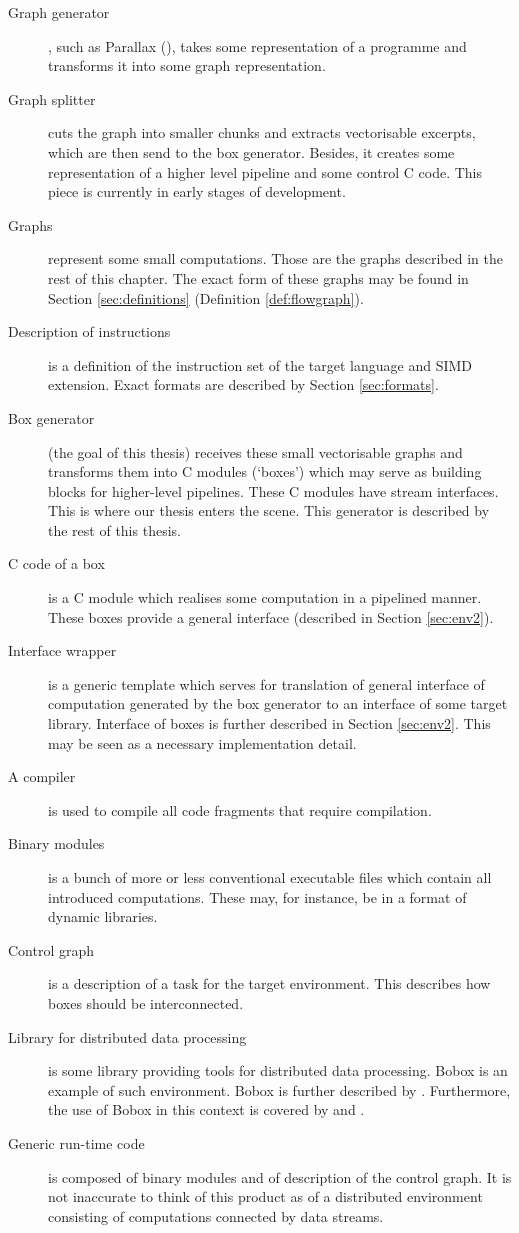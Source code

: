 \begin{description}
  \item[Graph generator], such as Parallax (\cite{pipelines}), takes some representation of a programme and transforms it into some graph representation. 
  \item[Graph splitter] cuts the graph into smaller chunks and extracts vectorisable excerpts, which are then send to the box generator. Besides, it creates some representation of a higher level pipeline and some control C code. This piece is currently in early stages of development.
  \item[Graphs] represent some small computations. Those are the graphs described in the rest of this chapter. The exact form of these graphs may be found in Section \ref{sec:definitions} (Definition \ref{def:flowgraph}).
  \item[Description of instructions] is a definition of the instruction set of the target language and SIMD extension. Exact formats are described by Section \ref{sec:formats}.
  \item[Box generator] (the goal of this thesis) receives these small vectorisable graphs and transforms them into C modules (`boxes') which may serve as building blocks for higher-level pipelines. These C modules have stream interfaces. This is where our thesis enters the scene. This generator is described by the rest of this thesis.
  \item[C code of a box] is a C module which realises some computation in a pipelined manner. These boxes provide a general interface (described in Section \ref{sec:env2}).
  \item[Interface wrapper] is a generic template which serves for translation of general interface of computation generated by the box generator to an interface of some target library. Interface of boxes is further described in Section \ref{sec:env2}. This may be seen as a necessary implementation detail.
  \item[A compiler] is used to compile all code fragments that require compilation.
  \item[Binary modules] is a bunch of more or less conventional executable files which contain all introduced computations. These may, for instance, be in a format of dynamic libraries.
  \item[Control graph] is a description of a task for the target environment. This describes how boxes should be interconnected.
  \item[Library for distributed data processing] is some library providing tools for distributed data processing. Bobox is an example of such environment. Bobox is further described by \cite{bobox}. Furthermore, the use of Bobox in this context is covered by \cite{pipelines} and \cite{hfg}. 
  \item[Generic run-time code] is composed of binary modules and of description of the control graph. It is not inaccurate to think of this product as of a distributed environment consisting of computations connected by data streams.
\end{description}


